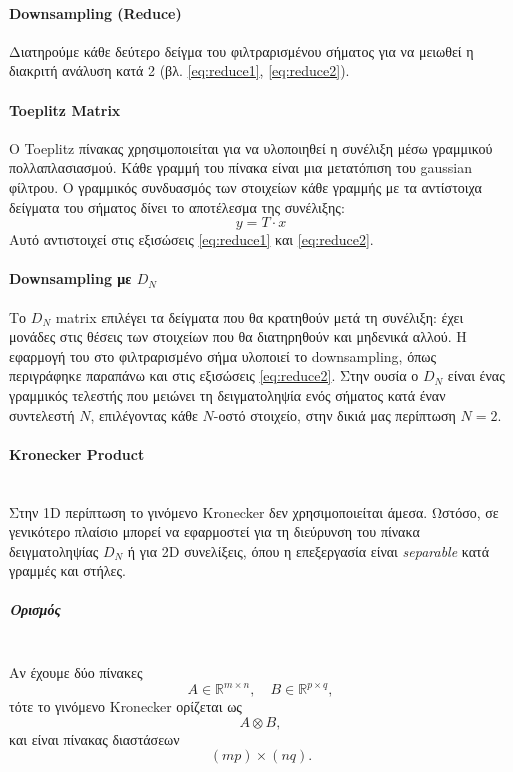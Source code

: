\documentclass[12pt]{article}
\begin{document}
\paragraph{Downsampling (Reduce)} \mbox{} 

Διατηρούμε κάθε δεύτερο δείγμα του φιλτραρισμένου σήματος για να μειωθεί η διακριτή ανάλυση κατά 2 (βλ. \eqref{eq:reduce1}, \eqref{eq:reduce2}).

\paragraph{Toeplitz Matrix}\mbox{} 

Ο Toeplitz πίνακας χρησιμοποιείται για να υλοποιηθεί η συνέλιξη μέσω γραμμικού πολλαπλασιασμού.  
Κάθε γραμμή του πίνακα είναι μια μετατόπιση του gaussian φίλτρου.  
Ο γραμμικός συνδυασμός των στοιχείων κάθε γραμμής με τα αντίστοιχα δείγματα του σήματος δίνει το αποτέλεσμα της συνέλιξης:
\[
y = T \cdot x
\]
Αυτό αντιστοιχεί στις εξισώσεις \eqref{eq:reduce1} και \eqref{eq:reduce2}.

\paragraph{Downsampling με $D_N$}\mbox{} 

Το $D_N$ matrix επιλέγει τα δείγματα που θα κρατηθούν μετά τη συνέλιξη:  
έχει μονάδες στις θέσεις των στοιχείων που θα διατηρηθούν και μηδενικά αλλού.  
Η εφαρμογή του στο φιλτραρισμένο σήμα υλοποιεί το downsampling,
όπως περιγράφηκε παραπάνω και στις εξισώσεις \eqref{eq:reduce2}.
Στην ουσία ο $D_N$ είναι ένας γραμμικός τελεστής που μειώνει τη δειγματοληψία ενός σήματος
κατά έναν συντελεστή $N$, επιλέγοντας κάθε $N$-οστό στοιχείο, στην δικιά μας περίπτωση $N = 2$.

\paragraph{Kronecker Product}
\mbox{}\\

Στην 1D περίπτωση το γινόμενο Kronecker δεν χρησιμοποιείται άμεσα.  
Ωστόσο, σε γενικότερο πλαίσιο μπορεί να εφαρμοστεί για τη διεύρυνση του πίνακα δειγματοληψίας $D_N$ ή για 2D συνελίξεις, όπου η επεξεργασία είναι \textit{separable} κατά γραμμές και στήλες.

\subparagraph{Ορισμός}
\mbox{} \\
Αν έχουμε δύο πίνακες
\[
A \in \mathbb{R}^{m \times n}, \quad B \in \mathbb{R}^{p \times q},
\]
τότε το γινόμενο Kronecker ορίζεται ως
\[
A \otimes B,
\]
και είναι πίνακας διαστάσεων
\[
(mp) \times (nq).
\]
\end{document}
